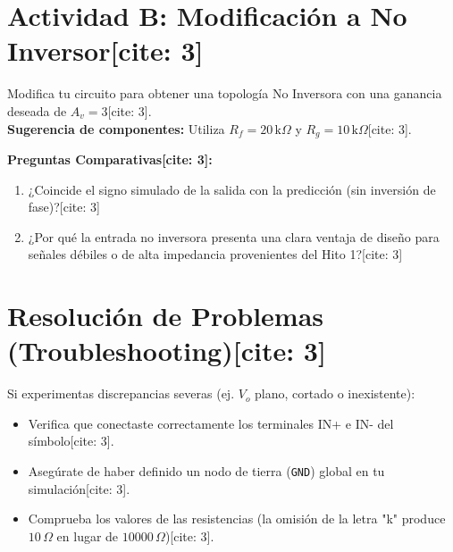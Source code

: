 \documentclass[11pt, a4paper]{article}
\begin{document}
\section*{Actividad B: Modificación a No Inversor[cite: 3]}
Modifica tu circuito para obtener una topología No Inversora con una ganancia deseada de $A_v = 3$[cite: 3]. \\
\textbf{Sugerencia de componentes:} Utiliza $R_f = 20\,\text{k}\Omega$ y $R_g = 10\,\text{k}\Omega$[cite: 3].

\vspace{0.3cm}
\textbf{Preguntas Comparativas[cite: 3]:}
\begin{enumerate}
    \item ¿Coincide el signo simulado de la salida con la predicción (sin inversión de fase)?[cite: 3]
    \item ¿Por qué la entrada no inversora presenta una clara ventaja de diseño para señales débiles o de alta impedancia provenientes del Hito 1?[cite: 3]
\end{enumerate}

\section*{Resolución de Problemas (Troubleshooting)[cite: 3]}
Si experimentas discrepancias severas (ej. $V_o$ plano, cortado o inexistente):
\begin{itemize}
    \item Verifica que conectaste correctamente los terminales IN+ e IN- del símbolo[cite: 3].
    \item Asegúrate de haber definido un nodo de tierra (\texttt{GND}) global en tu simulación[cite: 3].
    \item Comprueba los valores de las resistencias (la omisión de la letra "k" produce $10\,\Omega$ en lugar de $10000\,\Omega$)[cite: 3].
\end{itemize}
\end{document}
